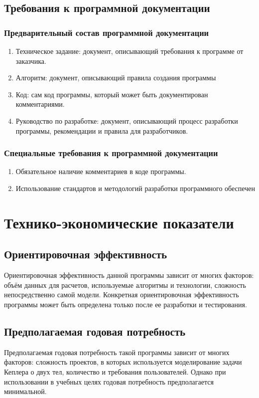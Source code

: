  \subsection{Требования к программной документации}

 \subsubsection{Предварительный состав программной документации}
 \begin{enumerate}
  \item Техническое задание: документ, описывающий требования к программе от заказчика.
  \item Алгоритм: документ, описывающий правила создания программы
  \item Код: сам код программы, который может быть документирован комментариями.
  \item Руководство по разработке: документ, описывающий процесс разработки программы, рекомендации и правила для разработчиков.
 \end{enumerate}

 \subsubsection{Специальные требования к программной документации}
 \begin{enumerate}
  \item Обязательное наличие комментариев в коде программы.
  \item Использование стандартов и методологий разработки программного обеспечен
 \end{enumerate}
 \section{Технико-экономические показатели}
 \subsection{Ориентировочная эффективность}
 Ориентировочная эффективность данной программы зависит от многих факторов: объём данных для расчетов, используемые алгоритмы и технологии, сложность непосредственно самой модели. Конкретная ориентировочная эффективность программы может быть определена только после ее разработки и тестирования.

 \subsection{Предполагаемая годовая потребность}
 Предполагаемая годовая потребность такой программы зависит от многих факторов: сложность проектов, в которых используется моделирование задачи Кеплера о двух тел, количество и требования пользователей. Однако при использовании в учебных целях годовая потребность предполагается минимальной.

